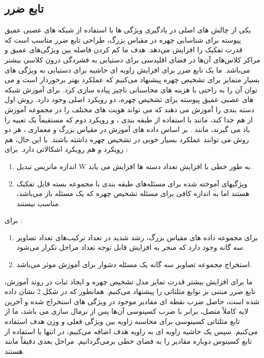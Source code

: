 \subsection{تابع ضرر}
یکی از چالش های اصلی در یادگیری ویژگی ها با استفاده از شبکه های عصبی عمیق پیوسته  برای شناسایی چهره در مقیاس بزرگ، طراحی تابع ضرر مناسب است که قدرت تفکیک را افزایش می‌دهد. هدف ما کم کردن فاصله بین ویژگی‌های عمیق و مراکز کلاس‌های آن‌ها در فضای اقلیدسی برای دستیابی به فشردگی درون کلاسی بیشتر می‌باشد. ما یک تابع ضرر برای افزایش زاویه ای حاشیه برای دستیابی به ویژگی های بسیار متمایز برای تشخیص چهره پیشنهاد می‌کنیم که عملکرد بهتر برخوردار است و می توان آن را به راحتی با هزینه های محاسباتی ناچیز پیاده سازی کرد.
\noindent
برای آموزش شبکه های عصبی عمیق پیوسته برای تشخیص چهره، دو رویکرد اصلی وجود دارد. روش اول دسته بندی را آموزش می دهند که می تواند هویت های مختلف را در مجموعه آموزش از هم جدا کند، مانند با استفاده از طبقه بندی ، و رویکرد دوم که مستقیماً یک تعبیه را یاد می گیرند، مانند . بر اساس داده های آموزش در مقیاس بزرگ و معماری ، هر دو روش می توانند عملکرد بسیار خوبی در تشخیص چهره داشته باشند. با این حال، هم رویکرد  و هم رویکرد  اشکالاتی دارد.
\noindent
برای :
\begin{enumerate}
\item
	اندازه ماتریس تبدیل W به طور خطی با افزایش تعداد دسته ها  افزایش می یابد.‌
\item 
ویژگیهای آموخته شده برای مسئله‌های طبقه بندی با مجموعه بسته قابل تفکیک هستند اما به اندازه کافی برای مسئله تشخیص چهره که یک مسئله باز می‌باشد، مناسب نیستند. 
\end{enumerate}
\noindent
برای :
\begin{enumerate}
\item
 برای مجموعه داده های مقیاس بزرگ، رشد شدید در تعداد ترکیب‌های تعداد تصاویر سه گانه وجود دارد که منجر به افزایش قابل توجه تعداد مراحل تکرار می‌شود.
\item 
 استخراج مجموعه تصاویر سه گانه یک مسئله دشوار برای آموزش موثر می‌باشد. 
\end{enumerate}
\noindent
ما برای افزایش بیشتر قدرت تمایز مدل تشخیص چهره و ایجاد ثبات در روند آموزش، تابع ضرر مبتنی بر توابع مثلثاتی را پیشنهاد می‌کنیم. همانطور که در شکل 2 نشان داده شده است، حاصل ضرب نقطه ای مقادیر موجود در ویژگی های استخراج شده و آخرین لایه کاملاً متصل، برابر با ضرب کسینوسی آن‌ها پس از نرمال سازی می باشد‌، ما از تابع مثلثاتی کسینوسی برای محاسبه زاویه بین ویژگی فعلی و وزن هدف استفاده می‌کنیم. سپس یک حاشیه زاویه ای به زاویه هدف اضافه می‌کنیم‌، در انتها با استفاده از تابع کسینوس دوباره مقادیر را به فضای خطی برمی‌گردانیم. مراحل بعدی دقیقاً مانند  هستند.
